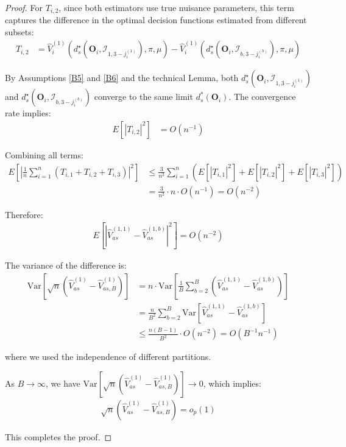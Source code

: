 \documentclass[11pt]{article}
\theoremstyle{referenceplain}
\theoremstyle{referencedefinition}
\theoremstyle{referenceremark}
\begin{document}
\begin{proof}
For $T_{i,2}$, since both estimators use true nuisance parameters, this term captures the difference in the optimal decision functions estimated from different subsets:
\begin{align*}
    T_{i,2} &= \widehat{V}_i^{(1)}(d_s^\star(\mathbf{O}_i,\mathcal{I}_{1,3-j_i^{(1)}}),\pi,\mu) - \widehat{V}_i^{(1)}(d_s^\star(\mathbf{O}_i,\mathcal{I}_{b,3-j_i^{(b)}}),\pi,\mu)
\end{align*}

By Assumptions \ref{B5} and \ref{B6} and the technical Lemma, both $d_s^\star(\mathbf{O}_i,\mathcal{I}_{1,3-j_i^{(1)}})$ and $d_s^\star(\mathbf{O}_i,\mathcal{I}_{b,3-j_i^{(b)}})$ converge to the same limit $d_s^*(\mathbf{O}_i)$. The convergence rate implies:
\begin{align*}
    E[|T_{i,2}|^2] &= O(n^{-1})
\end{align*}

Combining all terms:
\begin{align*}
    E\left[\left|\frac{1}{n}\sum_{i=1}^n (T_{i,1} + T_{i,2} + T_{i,3})\right|^2\right] &\leq \frac{3}{n^2}\sum_{i=1}^n \left(E[|T_{i,1}|^2] + E[|T_{i,2}|^2] + E[|T_{i,3}|^2]\right)\\
    &= \frac{3}{n^2} \cdot n \cdot O(n^{-1}) = O(n^{-2})
\end{align*}

Therefore:
\begin{align*}
    E[|\widehat{V}_{as}^{(1,1)} - \widehat{V}_{as}^{(1,b)}|^2] = O(n^{-2})
\end{align*}

The variance of the difference is:
\begin{align*}
    \text{Var}\left[\sqrt{n}(\widehat{V}_{as}^{(1)} - \widehat{V}_{as,B}^{(1)})\right] &= n \cdot \text{Var}\left[\frac{1}{B}\sum_{b=2}^B (\widehat{V}_{as}^{(1,1)} - \widehat{V}_{as}^{(1,b)})\right]\\
    &= \frac{n}{B^2} \sum_{b=2}^B \text{Var}[\widehat{V}_{as}^{(1,1)} - \widehat{V}_{as}^{(1,b)}]\\
    &\leq \frac{n(B-1)}{B^2} \cdot O(n^{-2}) = O(B^{-1}n^{-1})
\end{align*}

where we used the independence of different partitions.

As $B \to \infty$, we have $\text{Var}[\sqrt{n}(\widehat{V}_{as}^{(1)} - \widehat{V}_{as,B}^{(1)})] \to 0$, which implies:
\begin{align*}
    \sqrt{n}(\widehat{V}_{as}^{(1)} - \widehat{V}_{as,B}^{(1)}) = o_p(1)
\end{align*}

This completes the proof.
\end{proof}
\end{document}
